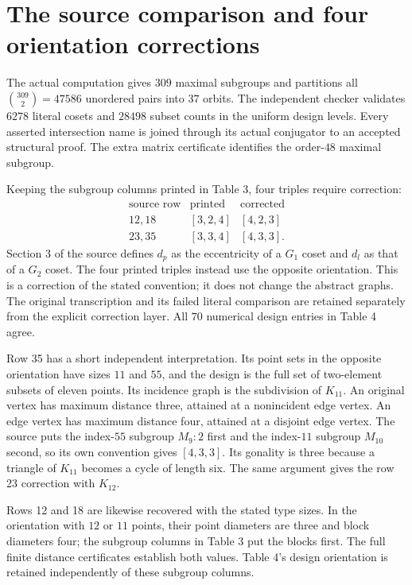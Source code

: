 \documentclass[11pt]{article}
\begin{document}
\section{The source comparison and four orientation corrections}
The actual computation gives $309$ maximal subgroups and partitions all
$\binom{309}{2}=47586$ unordered pairs into $37$ orbits. The independent
checker validates $6278$ literal cosets and $28498$ subset counts in the
uniform design levels. Every asserted intersection name is joined through
its actual conjugator to an accepted structural proof. The extra matrix
certificate identifies the order-$48$ maximal subgroup.

Keeping the subgroup columns printed in Table 3, four triples require
correction:
\[
\begin{array}{c|cc}
\text{source row}&\text{printed}&\text{corrected}\\\hline
12,18 &[3,2,4]&[4,2,3]\\
23,35 &[3,3,4]&[4,3,3].
\end{array}
\]
Section 3 of the source defines $d_p$ as the eccentricity of a $G_1$ coset
and $d_l$ as that of a $G_2$ coset. The four printed triples instead use
the opposite orientation. This is a correction of the stated convention;
it does not change the abstract graphs. The original transcription and
its failed literal comparison are retained separately from the explicit
correction layer. All $70$ numerical design entries in Table 4 agree.

Row 35 has a short independent interpretation. Its point sets in the
opposite orientation have sizes $11$ and $55$, and the design is the full
set of two-element subsets of eleven points. Its incidence graph is the
subdivision of $K_{11}$. An original vertex has maximum distance three,
attained at a nonincident edge vertex. An edge vertex has maximum distance
four, attained at a disjoint edge vertex. The source puts the index-$55$
subgroup $M_9:2$ first and the index-$11$ subgroup $M_{10}$ second, so its
own convention gives $[4,3,3]$. Its gonality is three because a triangle
of $K_{11}$ becomes a cycle of length six. The same argument gives the
row 23 correction with $K_{12}$.

Rows 12 and 18 are likewise recovered with the stated type sizes. In the
orientation with $12$ or $11$ points, their point diameters are three and
block diameters four; the subgroup columns in Table 3 put the blocks first.
The full finite distance certificates establish both values. Table 4's
design orientation is retained independently of these subgroup columns.
\end{document}

